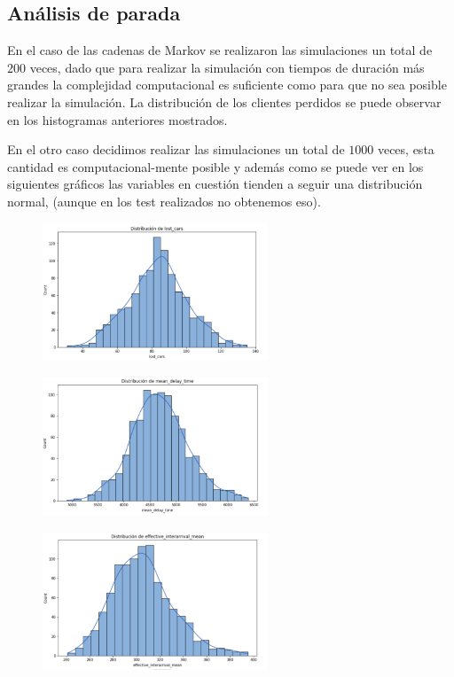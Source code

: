 \documentclass[14pt]{extarticle}
\begin{document}
\subsection{Análisis de parada}

En el caso de las cadenas de Markov se realizaron las simulaciones un total de $200$ veces, dado que para realizar la simulación con tiempos de duración más grandes la complejidad computacional es suficiente como para que no sea posible realizar la simulación. La distribución de los clientes perdidos se puede observar en los histogramas anteriores mostrados. 

En el otro caso decidimos realizar las simulaciones un total de $1000$ veces, esta cantidad es computacional-mente posible y además como se puede ver en los siguientes gráficos las variables en cuestión tienden a seguir una distribución normal, (aunque en los test realizados no obtenemos eso).

\begin{figure}[htbp]
    \centering
    \includegraphics[width=0.6\textwidth]{./lost_carss.png}
  \end{figure}

  \begin{figure}[htbp]
    \centering
    \includegraphics[width=0.6\textwidth]{./mean_delay_time.png}
  \end{figure}

  \begin{figure}[htbp]
    \centering
    \includegraphics[width=0.6\textwidth]{./effective_interarrival_mean.png}
  \end{figure}
\end{document}
